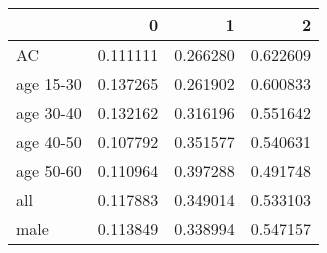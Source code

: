 \begin{tabular}{lrrr}
\toprule
{} &         0 &         1 &         2 \\
\midrule
AC        &  0.111111 &  0.266280 &  0.622609 \\
age 15-30 &  0.137265 &  0.261902 &  0.600833 \\
age 30-40 &  0.132162 &  0.316196 &  0.551642 \\
age 40-50 &  0.107792 &  0.351577 &  0.540631 \\
age 50-60 &  0.110964 &  0.397288 &  0.491748 \\
all       &  0.117883 &  0.349014 &  0.533103 \\
male      &  0.113849 &  0.338994 &  0.547157 \\
\bottomrule
\end{tabular}
